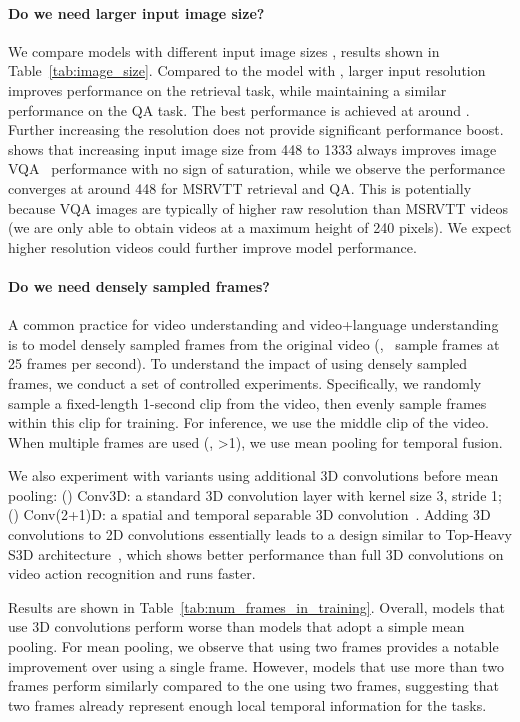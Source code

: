 \paragraph{Do we need larger input image size?} 
We compare models with different input image sizes , results shown in Table~\ref{tab:image_size}.
Compared to the model with , larger input resolution improves performance on the retrieval task, while maintaining a similar performance on the QA task.
The best performance is achieved at around . Further increasing the resolution does not provide significant performance boost.
\cite{jiang2020defense} shows that increasing input image size from 448 to 1333 always improves image VQA~\cite{antol2015vqa} performance with no sign of saturation, while we observe the performance converges at around 448 for MSRVTT retrieval and QA.
This is potentially because VQA images are typically of higher raw resolution than MSRVTT videos (we are only able to obtain videos at a maximum height of 240 pixels).
We expect higher resolution videos could further improve model performance.

\paragraph{Do we need densely sampled frames?} 
A common practice for video understanding and video+language understanding is to model densely sampled frames from the original video 
(\eg,~\cite{carreira2017quo,Xie_2018_ECCV} sample frames at 25 frames per second).
To understand the impact of using densely sampled frames, we conduct a set of controlled experiments. 
Specifically, we randomly sample a fixed-length 1-second clip from the video, then evenly sample  frames within this clip for training. 
For inference, we use the middle clip of the video.
When multiple frames are used (\ie, \textgreater1), we use mean pooling for temporal fusion. 

We also experiment with variants using additional 3D convolutions before mean pooling: () Conv3D: a standard 3D convolution layer with kernel size 3, stride 1; () Conv(2+1)D: a spatial and temporal separable 3D convolution~\cite{tran2018closer,Xie_2018_ECCV}.
Adding 3D convolutions to 2D convolutions essentially leads to a design similar to Top-Heavy S3D architecture~\cite{Xie_2018_ECCV}, which shows better performance than full 3D convolutions on video action recognition and runs faster.

Results are shown in Table~\ref{tab:num_frames_in_training}.
Overall, models that use 3D convolutions perform worse than models that adopt a simple mean pooling. 
For mean pooling, we observe that using two frames provides a notable improvement over using a single frame.
However, models that use more than two frames perform similarly compared to the one using two frames, suggesting that two frames already represent enough local temporal information for the tasks.


